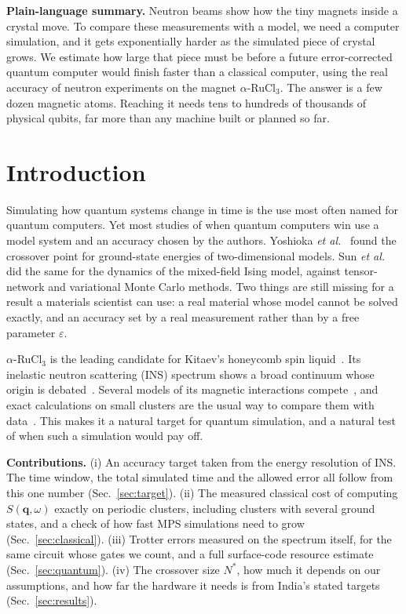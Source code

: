 \documentclass[conference]{IEEEtran}
\newcommand{\RuCl}{$\alpha$-RuCl$_3$}
\newcommand{\eps}{\varepsilon}
\begin{document}
\noindent\textbf{Plain-language summary.}
Neutron beams show how the tiny magnets inside a crystal move. To compare
these measurements with a model, we need a computer simulation, and it gets
exponentially harder as the simulated piece of crystal grows. We estimate
how large that piece must be before a future error-corrected quantum
computer would finish faster than a classical computer, using the real
accuracy of neutron experiments on the magnet \RuCl. The answer is a few
dozen magnetic atoms. Reaching it needs tens to hundreds of thousands of
physical qubits, far more than any machine built or planned so far.

\section{Introduction}

Simulating how quantum systems change in time is the use most often named
for quantum computers. Yet most studies of when quantum computers win use a
model system and an accuracy chosen by the authors. Yoshioka
\emph{et al.}~\cite{yoshioka2024} found the crossover point for
ground-state energies of two-dimensional models. Sun
\emph{et al.}~\cite{sun2026} did the same for the dynamics of the
mixed-field Ising model, against tensor-network and variational Monte Carlo
methods. Two things are still missing for a result a materials scientist
can use: a real material whose model cannot be solved exactly, and an
accuracy set by a real measurement rather than by a free parameter $\eps$.

\RuCl{} is the leading candidate for Kitaev's honeycomb spin
liquid~\cite{kitaev2006,jackeli2009,takagi2019}. Its inelastic neutron
scattering (INS) spectrum shows a broad continuum whose origin is
debated~\cite{banerjee2016,banerjee2017,do2017,winter2017}. Several models
of its magnetic interactions compete~\cite{winter2017,ran2017,laurell2020},
and exact calculations on small clusters are the usual way to compare them
with data~\cite{laurell2020}. This makes it a natural target for quantum
simulation, and a natural test of when such a simulation would pay off.

\textbf{Contributions.} (i) An accuracy target taken from the energy
resolution of INS. The time window, the total simulated time and the
allowed error all follow from this one number (Sec.~\ref{sec:target}).
(ii) The measured classical cost of computing $S(\mathbf q,\omega)$ exactly
on periodic clusters, including clusters with several ground states, and
a check of how fast MPS simulations need to grow
(Sec.~\ref{sec:classical}). (iii) Trotter errors measured on the spectrum
itself, for the same circuit whose gates we count, and a full surface-code
resource estimate (Sec.~\ref{sec:quantum}). (iv) The crossover size $N^*$, how much it
depends on our assumptions, and how far the hardware it needs is from
India's stated targets (Sec.~\ref{sec:results}).
\end{document}
